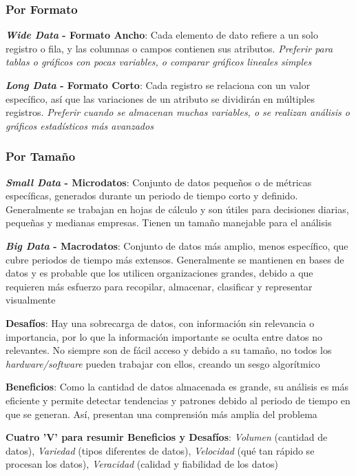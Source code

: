 \subsubsection{Por Formato}
\begin{description}
    \item {\textbf{\textit{Wide Data} - Formato Ancho}: Cada elemento de dato refiere a un solo registro o fila, y las columnas o campos contienen sus atributos. \textit{Preferir para tablas o gráficos con pocas variables, o comparar gráficos lineales simples}}
    \item {\textbf{\textit{Long Data} - Formato Corto}: Cada registro se relaciona con un valor específico, así que las variaciones de un atributo se dividirán en múltiples registros. \textit{Preferir cuando se almacenan muchas variables, o se realizan análisis o gráficos estadísticos más avanzados}}
\end{description}

\subsubsection{Por Tamaño}
\begin{description}
    \item {\textbf{\textit{Small Data} - Microdatos}: Conjunto de datos pequeños o de métricas específicas, generados durante un periodo de tiempo corto y definido. Generalmente se trabajan en hojas de cálculo y son útiles para decisiones diarias, pequeñas y medianas empresas. Tienen un tamaño manejable para el análisis}
    \item {\textbf{\textit{Big Data} - Macrodatos}: Conjunto de datos más amplio, menos específico, que cubre periodos de tiempo más extensos. Generalmente se mantienen en bases de datos y es probable que los utilicen organizaciones grandes, debido a que requieren más esfuerzo para recopilar, almacenar, clasificar y representar visualmente
    \begin{description}
        \item {\textbf{Desafíos}: Hay una sobrecarga de datos, con información sin relevancia o importancia, por lo que la información importante se oculta entre datos no relevantes. No siempre son de fácil acceso y debido a su tamaño, no todos los \textit{hardware/software} pueden trabajar con ellos, creando un sesgo algorítmico}
        \item {\textbf{Beneficios}: Como la cantidad de datos almacenada es grande, su análisis es más eficiente y permite detectar tendencias y patrones debido al periodo de tiempo en que se generan. Así, presentan una comprensión más amplia del problema}
        \item {\textbf{Cuatro 'V' para resumir Beneficios y Desafíos}: \textit{Volumen} (cantidad de datos), \textit{Variedad} (tipos diferentes de datos), \textit{Velocidad} (qué tan rápido se procesan los datos), \textit{Veracidad} (calidad y fiabilidad de los datos)}
    \end{description}}
\end{description}
\newpage